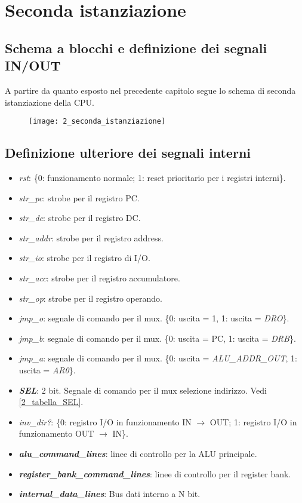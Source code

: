\chapter{Seconda istanziazione}
\section{Schema a blocchi e definizione dei segnali IN/OUT}
A partire da quanto esposto nel precedente capitolo segue lo schema di seconda istanziazione della CPU.
\newpage
\begin{figure}[H]
	\centering
	\texttt{[image: 2\_seconda\_istanziazione]}
	\label{fig:seconda_istanziazione}
\end{figure}

\newpage
\section{Definizione ulteriore dei segnali interni}
\begin{itemize}
	\item \textit{rst}: \{0: funzionamento normale; 1: reset prioritario per i registri interni\}.
	\item \textit{str\_pc}: strobe per il registro PC.
	\item \textit{str\_dc}: strobe per il registro DC.
	\item \textit{str\_addr}: strobe per il registro address.
	\item \textit{str\_io}: strobe per il registro di I/O.
	\item \textit{str\_acc}: strobe per il registro accumulatore.
	\item \textit{str\_op}: strobe per il registro operando.
	\item \textit{jmp\_o}: segnale di comando per il mux. \{0: uscita = 1, 1: uscita = \textit{DRO}\}.
	\item \textit{jmp\_b}: segnale di comando per il mux. \{0: uscita = PC, 1: uscita = \textit{DRB}\}.
	\item \textit{jmp\_a}: segnale di comando per il mux. \{0: uscita = \textit{ALU\_ADDR\_OUT}, 1: uscita = \textit{AR0}\}.
	\item \textit{\textbf{SEL}}: 2 bit. Segnale di comando per il mux selezione indirizzo. Vedi \ref{2_tabella_SEL}.
	\item \textit{inv\_dir?}: \{0: registro I/O in funzionamento IN $\rightarrow$ OUT; 1: registro I/O in funzionamento OUT $\rightarrow$ IN\}.
	\item \textit{\textbf{alu\_command\_lines}}: linee di controllo per la ALU principale.
	\item \textit{\textbf{register\_bank\_command\_lines}}: linee di controllo per il register bank.
	\item \textit{\textbf{internal\_data\_lines}}: Bus dati interno a N bit.
\end{itemize}


